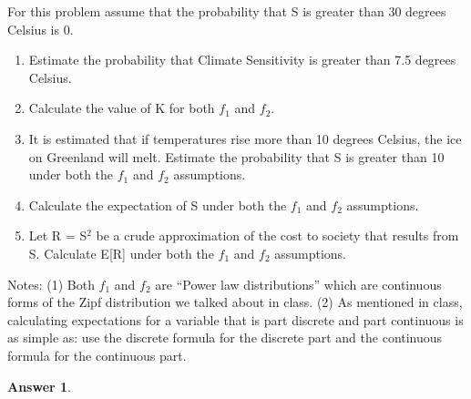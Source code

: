 \documentclass[12pt]{article}
\renewcommand{\(}{\left(}
\renewcommand{\)}{\right)}
\theoremstyle{definition}
\newtheorem*{answer}{Answer}
\begin{document}
\begin{enumerate}
{    For this problem assume that the probability that S is greater than 30 degrees Celsius is 0.
    \begin{enumerate}
        \item Estimate the probability that Climate Sensitivity is greater than 7.5 degrees Celsius.
        \item Calculate the value of K for both $f_1$ and $f_2$.
        \item It is estimated that if temperatures rise more than 10 degrees Celsius, the ice on Greenland will melt. Estimate the probability that S is greater than 10 under both the $f_1$ and $f_2$ assumptions.
        \item Calculate the expectation of S under both the $f_1$ and $f_2$ assumptions.
        \item Let R = S$^2$ be a crude approximation of the cost to society that results from S. Calculate E[R] under both the $f_1$ and $f_2$ assumptions.
    \end{enumerate}
    Notes: (1) Both $f_1$ and $f_2$ are ``Power law distributions'' which are continuous forms of the Zipf distribution we talked about in class. (2) As mentioned in class, calculating expectations for a variable that is part discrete and part continuous is as simple as: use the discrete formula for the discrete part and the continuous formula for the continuous part.
    
    \begin{shaded}
    \begin{answer}
    
    \end{answer}
    \end{shaded}
    
}
\end{enumerate}
\end{document}
